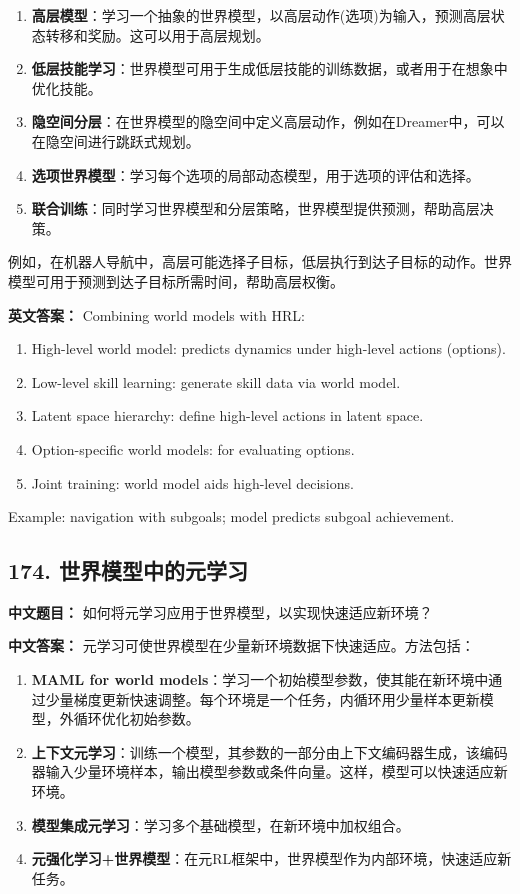 \documentclass[10pt,a4paper]{ctexart}
\begin{document}
\begin{enumerate}
    \item \textbf{高层模型}：学习一个抽象的世界模型，以高层动作(选项)为输入，预测高层状态转移和奖励。这可以用于高层规划。
    \item \textbf{低层技能学习}：世界模型可用于生成低层技能的训练数据，或者用于在想象中优化技能。
    \item \textbf{隐空间分层}：在世界模型的隐空间中定义高层动作，例如在Dreamer中，可以在隐空间进行跳跃式规划。
    \item \textbf{选项世界模型}：学习每个选项的局部动态模型，用于选项的评估和选择。
    \item \textbf{联合训练}：同时学习世界模型和分层策略，世界模型提供预测，帮助高层决策。
\end{enumerate}

例如，在机器人导航中，高层可能选择子目标，低层执行到达子目标的动作。世界模型可用于预测到达子目标所需时间，帮助高层权衡。

\textbf{英文答案：}  
Combining world models with HRL:

\begin{enumerate}
    \item High-level world model: predicts dynamics under high-level actions (options).
    \item Low-level skill learning: generate skill data via world model.
    \item Latent space hierarchy: define high-level actions in latent space.
    \item Option-specific world models: for evaluating options.
    \item Joint training: world model aids high-level decisions.
\end{enumerate}

Example: navigation with subgoals; model predicts subgoal achievement.

\subsection*{174. 世界模型中的元学习}
\textbf{中文题目：} 如何将元学习应用于世界模型，以实现快速适应新环境？

\textbf{中文答案：}  
元学习可使世界模型在少量新环境数据下快速适应。方法包括：

\begin{enumerate}
    \item \textbf{MAML for world models}：学习一个初始模型参数，使其能在新环境中通过少量梯度更新快速调整。每个环境是一个任务，内循环用少量样本更新模型，外循环优化初始参数。
    \item \textbf{上下文元学习}：训练一个模型，其参数的一部分由上下文编码器生成，该编码器输入少量环境样本，输出模型参数或条件向量。这样，模型可以快速适应新环境。
    \item \textbf{模型集成元学习}：学习多个基础模型，在新环境中加权组合。
    \item \textbf{元强化学习+世界模型}：在元RL框架中，世界模型作为内部环境，快速适应新任务。
\end{enumerate}
\end{document}
